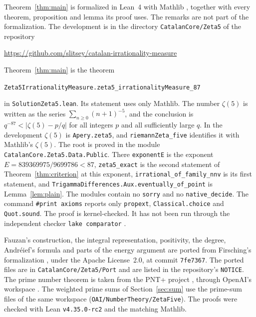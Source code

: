 \documentclass[11pt]{amsart}
\newcommand{\FormalizationURL}{https://github.com/slitsey/catalan-irrationality-measure}
\newcommand{\FormalizationLink}{\url{\FormalizationURL}}
\theoremstyle{definition}
\theoremstyle{remark}
\numberwithin{equation}{section}
\newcommand{\lean}[1]{\nolinkurl{#1}}
\begin{document}
Theorem~\ref{thm:main} is formalized in Lean~4 \cite{Lean4} with Mathlib \cite{Mathlib}, together with every theorem,
proposition and lemma its proof uses. The remarks are not part of the formalization. The development is in the
directory \lean{CatalanCore/Zeta5} of the repository
\begin{center}
\FormalizationLink
\end{center}
Theorem~\ref{thm:main} is the theorem
\begin{center}
{\small\texttt{Zeta5IrrationalityMeasure.zeta5\_irrationalityMeasure\_87}}
\end{center}
in \lean{SolutionZeta5.lean}. Its statement uses only Mathlib. The number $\zeta(5)$ is written as the series
$\sum_{n\ge0}(n+1)^{-5}$, and the conclusion is $q^{-87}<|\zeta(5)-p/q|$ for all integers $p$ and all sufficiently
large $q$. In the development $\zeta(5)$ is \lean{Apery.zeta5}, and \lean{riemannZeta_five} identifies it with
Mathlib's $\zeta(5)$. The root is proved in the module \lean{CatalanCore.Zeta5.Data.Public}. There
\lean{exponentE} is the exponent $E=839369975/9699786<87$, \lean{zeta5_exact} is the second statement of
Theorem~\ref{thm:criterion} at this exponent, \lean{irrational_of_family_nnv} is its first statement, and
\lean{TrigammaDifferences.Aux.eventually_of_point} is Lemma~\ref{lem:plain}. The modules contain no \lean{sorry} and no
\lean{native_decide}. The command \lean{\#print axioms} reports only \lean{propext}, \lean{Classical.choice} and
\lean{Quot.sound}. The proof is kernel-checked. It has not been run through the independent checker
\lean{lake comparator} \cite{Comparator}.

Fauzan's construction, the integral representation, positivity, the degree, Andr\'eief's formula and parts of the
energy argument are ported from Firsching's formalization \cite{Firsching26}, under the Apache License~2.0, at commit
\texttt{7fe7367}. The ported files are in \lean{CatalanCore/Zeta5/Port} and are listed in the repository's
\texttt{NOTICE}. The prime number theorem is taken from the PNT+ project \cite{PNTPlus}, through OpenAI's workspace
\cite{OpenAI2026}. The weighted prime sums of Section~\ref{sec:sum} use the prime-sum files of the same workspace
(\lean{OAI/NumberTheory/ZetaFive}). The proofs were checked with Lean \texttt{v4.35.0-rc2} and the matching Mathlib.
\end{document}
